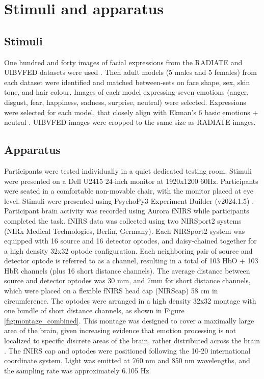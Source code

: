 \section{Stimuli and apparatus}
\subsection{Stimuli}
One hundred and forty images of facial expressions from the RADIATE and UIBVFED datasets were used \citep{conley_racially_2018, oliver_uibvfed_2020}.
Then adult models (5 males and 5 females) from each dataset were identified and matched between-sets on face shape, sex, skin tone, and hair colour. 
Images of each model expressing seven emotions (anger, disgust, fear, happiness, sadness, surprise, neutral) were selected. 
Expressions were selected for each model, that closely align with Ekman's 6 basic emotions + neutral \citep{ekman1971constants}.
UIBVFED images were cropped to the same size as RADIATE images. 

\subsection{Apparatus}
Participants were tested individually in a quiet dedicated testing room. 
Stimuli were presented on a Dell U2415 24-inch monitor at 1920x1200 60Hz. 
Participants were seated in a comfortable non-movable chair, with the monitor placed at eye level. 
Stimuli were presented using PsychoPy3 Experiment Builder (v2024.1.5) \citep{peirce_psychopy2_2019}. 
Participant brain activity was recorded using Aurora fNIRS while participants completed the task. 
fNIRS data was collected using two NIRSport2 systems (NIRx Medical Technologies, Berlin, Germany). 
Each NIRSport2 system was equipped with 16 source and 16 detector optodes, and daisy-chained together for a high density 32x32 optode configuration. 
Each neighboring pair of source and detector optode is referred to as a channel, resulting in a total of 103 HbO + 103 HbR channels (plus 16 short distance channels).
The average distance between source and detector optodes was 30 mm, and 7mm for short distance channels, which were placed on a flexible fNIRS head cap (NIRScap) 58 cm in circumference. 
The optodes were arranged in a high density 32x32 montage with one bundle of short distance channels, as shown in Figure \ref{fig:montage_combined}.
This montage was designed to cover a maximally large area of the brain, given increasing evidence that emotion processing is not localized to specific discrete areas of the brain, rather distributed across the brain \citep{lindquist_brain_2012}. 
The fNIRS cap and optodes were positioned following the 10-20 international coordinate system.
Light was emitted at 760 nm and 850 nm wavelengths, and the sampling rate was approximately 6.105 Hz.

